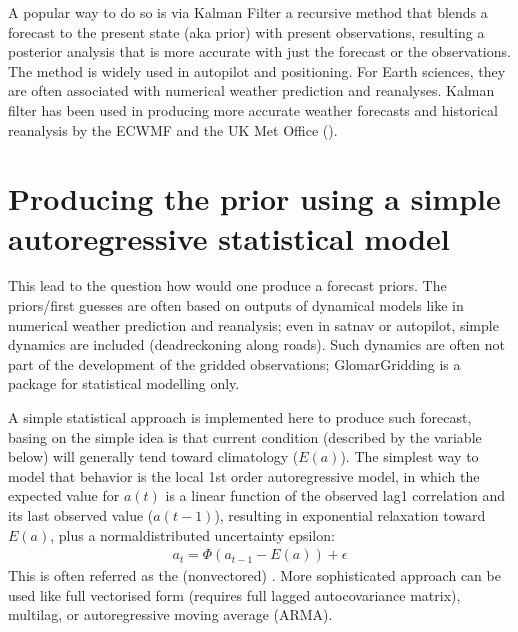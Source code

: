 \documentclass[letterpaper,10pt,english]{sphinxmanual}
\begin{document}
\sphinxAtStartPar
A popular way to do so is via Kalman Filter \textendash{} a recursive method that blends a forecast to the
present state (aka prior) with present observations, resulting a posterior analysis that is more
accurate with just the forecast or the observations. The method is widely used in autopilot and
positioning. For Earth sciences, they are often associated with numerical weather prediction and
reanalyses. Kalman filter has been used in producing more accurate weather forecasts and historical
reanalysis by the ECWMF and the UK Met Office
().


\section{Producing the prior using a simple autoregressive statistical model}
\label{\detokenize{kalman:producing-the-prior-using-a-simple-autoregressive-statistical-model}}
\sphinxAtStartPar
This lead to the question how would one produce a forecast priors. The priors/first guesses are
often based on outputs of dynamical models like in numerical weather prediction and reanalysis; even
in satnav or autopilot, simple dynamics are included (dead\sphinxhyphen{}reckoning along roads). Such dynamics are
often not part of the development of the gridded observations; GlomarGridding is a package for
statistical modelling only.

\sphinxAtStartPar
A simple statistical approach is implemented here to produce such forecast, basing on the simple
idea is that current condition (described by the variable  below) will generally tend toward
climatology (\(E(a)\)). The simplest way to model that behavior is the local 1st order autoregressive
model, in which the expected value for \(a(t)\) is a linear function of the observed lag\sphinxhyphen{}1 correlation
and its last observed value (\(a(t-1)\)), resulting in exponential relaxation toward \(E(a)\), plus a
normal\sphinxhyphen{}distributed uncertainty epsilon:
\begin{equation*}
\begin{split}a_{t} = \Phi (a_{t-1} - E(a)) + \epsilon\end{split}
\end{equation*}
\sphinxAtStartPar
This is often referred as the (non\sphinxhyphen{}vectored)  . More sophisticated approach can be used
like full vectorised form (requires full lagged autocovariance matrix), multi\sphinxhyphen{}lag, or autoregressive
moving average (ARMA).
\end{document}
